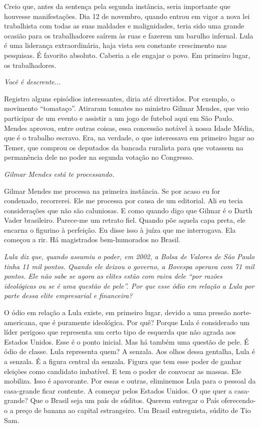 \normalfont 
Creio que, antes da sentença pela segunda instância,
seria importante que houvesse manifestações. Dia 12 de novembro, quando
entrou em vigor a nova lei trabalhista com todas as suas maldades e
malignidades, teria sido uma grande ocasião para os trabalhadores saírem
às ruas e fazerem um barulho infernal. Lula é uma liderança
extraordinária, haja vista seu constante crescimento nas pesquisas. É
favorito absoluto. Caberia a ele engajar o povo. Em primeiro lugar, os
trabalhadores.

\itshape
 Você é descrente...

\normalfont 
Registro alguns episódios interessantes, diria até
divertidos. Por exemplo, o movimento ``tomataço''. Atiraram tomates no
ministro Gilmar Mendes, que veio participar de um evento e assistir a um
jogo de futebol aqui em São Paulo. Mendes aprovou, entre outras coisas,
essa concessão notável à nossa Idade Média, que é o trabalho escravo.
Era, na verdade, o que interessava em primeiro lugar ao Temer, que
comprou os deputados da bancada ruralista para que votassem na
permanência dele no poder na segunda votação no Congresso.

\itshape
 Gilmar Mendes está te processando.

\normalfont 
Gilmar Mendes me processa na primeira instância. Se por
acaso eu for condenado, recorrerei. Ele me processa por causa de um
editorial. Ali eu tecia considerações que não são caluniosas. E como
quando digo que Gilmar é o Darth Vader brasileiro. Parece-me um retrato
fiel. Quando põe aquela capa preta, ele encarna o figurino à perfeição.
Eu disse isso à juíza que me interrogava. Ela começou a rir. Há
magistrados bem-humorados no Brasil.

\itshape
 Lula diz que, quando assumiu o poder, em 2002, a Bolsa
de Valores de São Paulo tinha 11 mil pontos. Quando ele deixou o
governo, a Bovespa operava com 71 mil pontos. Ele não sabe se agora as
elites estão com raiva dele ``por razões ideológicas ou se é uma questão
de pele''. Por que esse ódio em relação a Lula por parte dessa elite
empresarial e financeira?

\normalfont 
O ódio em relação a Lula existe, em primeiro lugar,
devido a uma pressão norte-americana, que é puramente ideológica.
\protect\hypertarget{_Hlk498163994}{}{}Por quê? Porque Lula é
considerado um líder perigoso que representa um certo tipo de esquerda
que não agrada aos Estados Unidos. Esse é o ponto inicial. Mas há também
uma questão de pele. É ódio de classe. Lula representa quem? A senzala.
Aos olhos dessa gentalha, Lula é a senzala. É a figura central da
senzala. Figura que tem esse poder de ganhar eleições como candidato
imbatível. E tem o poder de convocar as massas. Ele mobiliza. Isso é
apavorante. Por essas e outras, eliminemos Lula para o pessoal da
casa-grande ficar contente. A começar pelos Estados Unidos. O que quer a
casa-grande? Que o Brasil seja um país de súditos. Querem entregar o
País oferecendo-o a preço de banana ao capital estrangeiro. Um Brasil
entreguista, súdito de Tio Sam.

